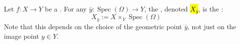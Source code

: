 \begin{definition} \label{definition:geometric_fiber_of_a_morphism_of_schemes_at_a_geometric_point}
Let $f: X \to Y$ be a . 
For any  $\bar{y}: \operatorname{Spec}(\Omega) \to Y$, the , denoted \hl{$X_{\bar{y}}$}, is the :
$$X_{\bar{y}} := X \times_Y \operatorname{Spec}(\Omega)$$
Note that this depends on the choice of the geometric point $\bar{y}$, not just on the image point $y \in Y$.
\end{definition}